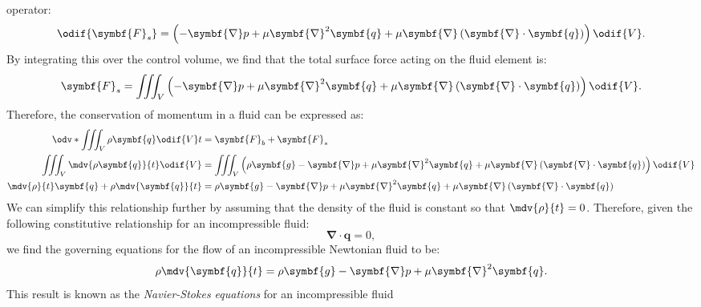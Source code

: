 \documentclass{article}
\theoremstyle{definition}
\begin{document}
operator:
\begin{equation*}
    \odif{\symbf{F}_s} = \left( -\symbf{\nabla} p + \mu \symbf{\nabla}^2 \symbf{q} + \mu \symbf{\nabla} \left( \symbf{\nabla} \cdot \symbf{q} \right) \right) \odif{V}.
\end{equation*}
By integrating this over the control volume, we find that the total
surface force acting on the fluid element is:
\begin{equation*}
    \symbf{F}_s = \iiint_V \left( -\symbf{\nabla} p + \mu \symbf{\nabla}^2 \symbf{q} + \mu \symbf{\nabla} \left( \symbf{\nabla} \cdot \symbf{q} \right) \right) \odif{V}.
\end{equation*}
Therefore, the conservation of momentum in a fluid can be expressed as:
\begin{align*}
    \odv*{\iiint_V \rho \symbf{q} \odif{V}}{t}        & = \symbf{F}_b + \symbf{F}_s                                                                                                                                             \\
    \iiint_V \mdv{\rho \symbf{q}}{t} \odif{V}         & = \iiint_V \left( \rho \symbf{g} -\symbf{\nabla} p + \mu \symbf{\nabla}^2 \symbf{q} + \mu \symbf{\nabla} \left( \symbf{\nabla} \cdot \symbf{q} \right) \right) \odif{V} \\
    \mdv{\rho}{t} \symbf{q} + \rho \mdv{\symbf{q}}{t} & = \rho \symbf{g} - \symbf{\nabla} p + \mu \symbf{\nabla}^2 \symbf{q} + \mu \symbf{\nabla} \left( \symbf{\nabla} \cdot \symbf{q} \right)                                 \\
\end{align*}
We can simplify this relationship further by assuming that the density
of the fluid is constant so that \(\mdv{\rho}{t} = 0\). Therefore, given
the following constitutive relationship for an incompressible fluid:
\begin{equation*}
    \symbf{\nabla} \cdot \symbf{q} = 0,
\end{equation*}
we find the governing equations for the flow of an incompressible
Newtonian fluid to be:
\begin{equation*}
    \rho \mdv{\symbf{q}}{t} = \rho \symbf{g} - \symbf{\nabla} p + \mu \symbf{\nabla}^2 \symbf{q}.
\end{equation*}
This result is known as the \textit{Navier-Stokes equations} for an
incompressible fluid
\end{document}
